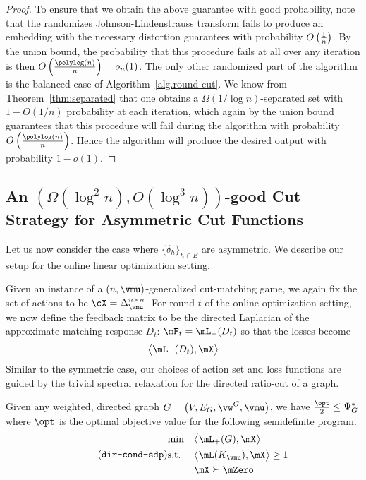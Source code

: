 \documentclass[letterpaper]{article}
\begin{document}
\begin{proof}
To ensure that we obtain the above guarantee with good probability, note that the randomizes Johnson-Lindenstrauss transform fails to produce an embedding with the necessary distortion guarantees with probability $O\left({1\over n}\right)$. By the union bound, the probability that this procedure fails at all over any iteration is then $O\left({\polylog(n) \over n}\right) = o_n(1)$. The only other randomized part of the algorithm is the balanced case of Algorithm~\ref{alg.round-cut}. We know from Theorem~\ref{thm:separated} that one obtains a $\Omega\left(1/\log n\right)$-separated set with $1-O(1/n)$ probability at each iteration, which again by the union bound guarantees that this procedure will fail during the algorithm with probability $O\left({\polylog(n) \over n}\right)$. Hence the algorithm will produce the desired output with probability $1-o(1)$.
\end{proof}


\subsection{An \texorpdfstring{$\left( \Omega (\log^2 n), O ( \log^3 n ) \right)$}{(Omega(log\^2 n), O(log\^3 n))}-good Cut Strategy for Asymmetric Cut Functions}

Let us now consider the case where $\{ \delta_h \}_{h \in E}$ are asymmetric. We describe our setup for the online linear optimization setting.

Given an instance of a $(n, \vmu)$-generalized cut-matching game, we again fix the set of actions to be $\cX = \Delta_{\vmu}^{n \times n}$. For round $t$ of the online optimization setting, we now define the feedback matrix to be the directed Laplacian of the approximate matching response $D_t$: $\mF_t = \mL_{+}(D_t)$ so that the losses become
\begin{equation*}
\big\langle \mL_{+}(D_t), \mX \big\rangle
\end{equation*}
Similar to the symmetric case, our choices of action set and loss functions are guided by the trivial spectral relaxation for the directed ratio-cut of a graph.
\begin{lemma}
\label{lem.asym-cut-strat.relaxation}
Given any weighted, directed graph $G = \big( V, E_G, \vw^G, \vmu \big)$, we have $\frac{\opt}{2} \leq \Psi_G^*$ where $\opt$ is the optimal objective value for the following semidefinite program.
\begin{equation*}
\stepcounter{equation}
\tag{\texttt{dir-cond-sdp}}
\label{eq.dir-cond-sdp}
\begin{aligned}
& {\min}
& & \big\langle \mL_{+}(G), \mX \big\rangle \\
& \textup{s.t.}
& & \big\langle \mL(K_{\vmu}), \mX \big\rangle \geq 1 \\
& & & \mX \succeq \mZero
\end{aligned}
\end{equation*}
\end{lemma}
\end{document}
